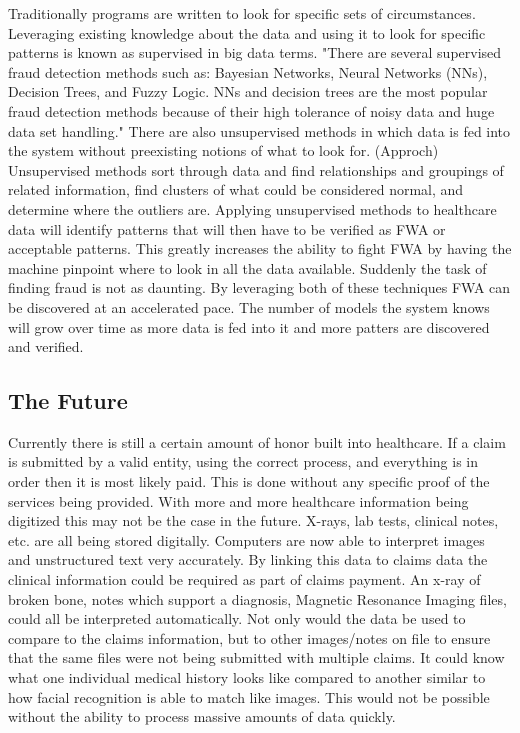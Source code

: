 \documentclass[sigconf]{acmart}
\begin{document}
Traditionally programs are written to look for specific sets of circumstances.  Leveraging existing knowledge about the data and using it to look for specific patterns is known as supervised in big data terms.  "There are several supervised fraud detection methods such as: Bayesian Networks, Neural Networks (NNs), Decision Trees, and Fuzzy Logic. NNs and decision trees are the most popular fraud detection methods because of their high tolerance of noisy data and huge data set handling."  There are also unsupervised methods in which data is fed into the system without preexisting notions of what to look for.  (Approch)  Unsupervised methods sort through data and find relationships and groupings of related information, find clusters of what could be considered normal, and determine where the outliers are.  Applying unsupervised methods to healthcare data will identify patterns that will then have to be verified as FWA or acceptable patterns.  This greatly increases the ability to fight FWA by having the machine pinpoint where to look in all the data available.  Suddenly the task of finding fraud is not as daunting.  By leveraging both of these techniques FWA can be discovered at an accelerated pace.  The number of models the system knows will grow over time as more data is fed into it and more patters are discovered and verified.

\subsection{The Future}

Currently there is still a certain amount of honor built into healthcare.  If a claim is submitted by a valid entity, using the correct process, and everything is in order then it is most likely paid.  This is done without any specific proof of the services being provided.  With more and more healthcare information being digitized this may not be the case in the future.  X-rays, lab tests, clinical notes, etc. are all being stored digitally.  Computers are now able to interpret images and unstructured text very accurately.  By linking this data to claims data the clinical information could be required as part of claims payment.  An x-ray of broken bone, notes which support a diagnosis, Magnetic Resonance Imaging files, could all be interpreted automatically.  Not only would the data be used to compare to the claims information, but to other images/notes on file to ensure that the same files were not being submitted with multiple claims.  It could know what one individual medical history looks like compared to another similar to how facial recognition is able to match like images.  This would not be possible without the ability to process massive amounts of data quickly.  
\end{document}
